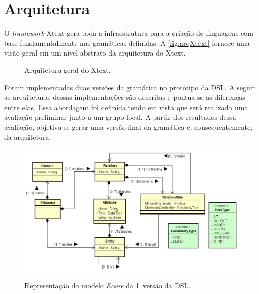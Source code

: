 \section{Arquitetura} \label{sec:arqDSL}

O \textit{framework} Xtext gera toda a infraestrutura para a criação de linguagens com base fundamentalmente nas gramáticas definidas. 
A \autoref{fig:arqXtext} fornece uma visão geral em um nível abstrato da arquitetura do Xtext. 

\begin{figure}[!htb]
    \centering
    \caption{Arquitetura geral do Xtext.}
    
    \label{fig:arqXtext}
\end{figure}

Foram implementadas duas versões da gramática no protótipo da \ac{DSL}. 
A seguir as arquiteturas dessas implementações são descritas e pontua-se as diferenças entre elas. 
Essa abordagem foi definida tendo em vista que será realizada uma avaliação preliminar junto a um grupo focal. 
A partir dos resultados dessa avaliação, objetiva-se gerar uma versão final da gramática e, consequentemente, da arquitetura.

\begin{figure}[!htb]
    \centering
    \caption{Representação do modelo \textit{Ecore} da 1\degree~versão da DSL.}
    \includegraphics[width=\textwidth]{img/erDslClassDiagram.png}
    \label{fig:ERDSL}
\end{figure}

